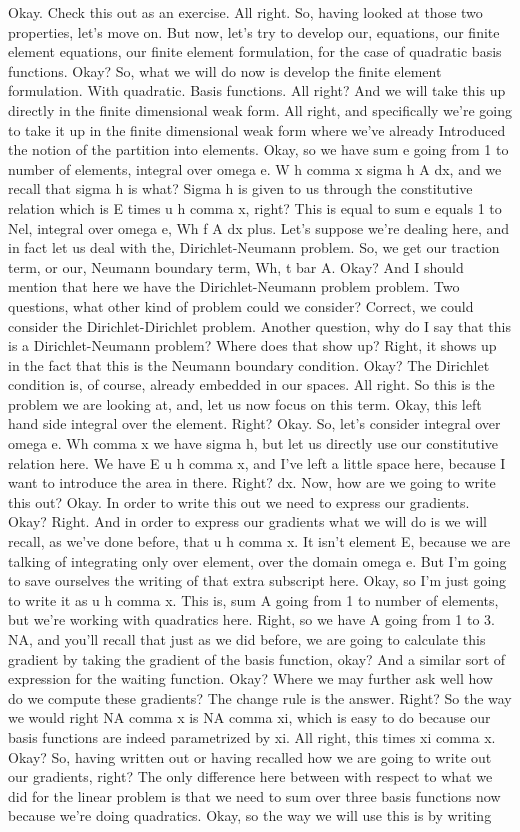 \documentclass[10pt]{article}
\begin{document}
Okay. Check this out as an exercise. All right. So, having looked at those two properties, let's move on. But now, let's try to develop our, equations, our finite element equations, our finite element formulation, for the case of quadratic basis functions. Okay? So, what we will do now is develop the finite element formulation. With quadratic. Basis functions. All right? And we will take this up directly in the finite dimensional weak form. All right, and specifically we're going to take it up in the finite dimensional weak form where we've already Introduced the notion of the partition into elements. Okay, so we have sum e going from 1 to number of elements, integral over omega e. W h comma x sigma h A dx, and we recall that sigma h is what? Sigma h is given to us through the constitutive relation which is E times u h comma x, right? This is equal to sum e equals 1 to Nel, integral over omega e, Wh f A dx plus. Let's suppose we're dealing here, and in fact let us deal with the, Dirichlet-Neumann problem. So, we get our traction term, or our, Neumann boundary term, Wh, t bar A. Okay? And I should mention that here we have the Dirichlet-Neumann problem problem. Two questions, what other kind of problem could we consider? Correct, we could consider the Dirichlet-Dirichlet problem. Another question, why do I say that this is a Dirichlet-Neumann problem? Where does that show up? Right, it shows up in the fact that this is the Neumann boundary condition. Okay? The Dirichlet condition is, of course, already embedded in our spaces. All right. So this is the problem we are looking at, and, let us now focus on this term. Okay, this left hand side integral over the element. Right? Okay. So, let's consider integral over omega e. Wh comma x we have sigma h, but let us directly use our constitutive relation here. We have E u h comma x, and I've left a little space here, because I want to introduce the area in there. Right? dx. Now, how are we going to write this out? Okay. In order to write this out we need to express our gradients. Okay? Right. And in order to express our gradients what we will do is we will recall, as we've done before, that u h comma x. It isn't element E, because we are talking of integrating only over element, over the domain omega e. But I'm going to save ourselves the writing of that extra subscript here. Okay, so I'm just going to write it as u h comma x. This is, sum A going from 1 to number of elements, but we're working with quadratics here. Right, so we have A going from 1 to 3. NA, and you'll recall that just as we did before, we are going to calculate this gradient by taking the gradient of the basis function, okay? And a similar sort of expression for the waiting function. Okay? Where we may further ask well how do we compute these gradients? The change rule is the answer. Right? So the way we would right NA comma x is NA comma xi, which is easy to do because our basis functions are indeed parametrized by xi. All right, this times xi comma x. Okay? So, having written out or having recalled how we are going to write out our gradients, right? The only difference here between with respect to what we did for the linear problem is that we need to sum over three basis functions now because we're doing quadratics. Okay, so the way we will use this is by writing 
\end{document}
